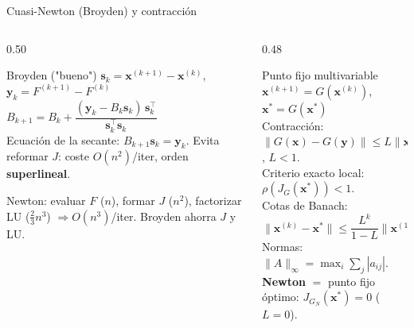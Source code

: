 \documentclass[aspectratio=169,10pt]{beamer}
\begin{document}
\begin{frame}{Cuasi-Newton (Broyden) y contracción}
\begin{columns}[T]
\begin{column}{0.50\textwidth}
\begin{cardidea}{Broyden ("bueno")}{\faSuperscript}
{\footnotesize $\mathbf s_k=\mathbf x^{(k+1)}-\mathbf x^{(k)}$, $\mathbf y_k=F^{(k+1)}-F^{(k)}$\\[1.2mm]
$B_{k+1}=B_k+\dfrac{(\mathbf y_k-B_k\mathbf s_k)\,\mathbf s_k^{\top}}{\mathbf s_k^{\top}\mathbf s_k}$\\[1.4mm]
Ecuación de la secante: $B_{k+1}\mathbf s_k=\mathbf y_k$. Evita reformar $J$: coste $O(n^2)$/iter, orden \textbf{superlineal}.}
\end{cardidea}
\vspace{1mm}
\begin{cardnota}[\faInfoCircle]{\footnotesize Newton: evaluar $F$ ($n$), formar $J$ ($n^2$), factorizar LU ($\tfrac23 n^3$) $\Rightarrow O(n^3)$/iter. Broyden ahorra $J$ y LU.}\end{cardnota}
\end{column}
\begin{column}{0.48\textwidth}
\begin{cardgear}{Punto fijo multivariable}{\faCogs}
{\footnotesize $\mathbf x^{(k+1)}=G(\mathbf x^{(k)})$, $\mathbf x^{*}=G(\mathbf x^{*})$\\[1.0mm]
Contracción: $\|G(\mathbf x)-G(\mathbf y)\|\le L\|\mathbf x-\mathbf y\|$, $L<1$.\\[1.0mm]
Criterio exacto local: $\rho(J_G(\mathbf x^{*}))<1$.\\[1.0mm]
Cotas de Banach:\\[0.2mm]
$\|\mathbf x^{(k)}-\mathbf x^{*}\|\le\dfrac{L^k}{1-L}\|\mathbf x^{(1)}-\mathbf x^{(0)}\|$\\[1.4mm]
Normas: $\|A\|_\infty=\max_i\sum_j|a_{ij}|$.\\[0.8mm]
\textbf{Newton} $=$ punto fijo óptimo: $J_{G_N}(\mathbf x^{*})=0$ ($L=0$).}
\end{cardgear}
\end{column}
\end{columns}
\end{frame}
\end{document}
